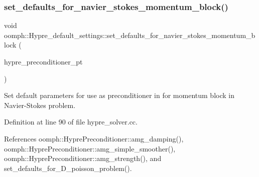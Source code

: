 \subsubsection{\texorpdfstring{set\+\_\+defaults\+\_\+for\+\_\+navier\+\_\+stokes\+\_\+momentum\+\_\+block()}{set\_defaults\_for\_navier\_stokes\_momentum\_block()}}
{\footnotesize\ttfamily void oomph\+::\+Hypre\+\_\+default\+\_\+settings\+::set\+\_\+defaults\+\_\+for\+\_\+navier\+\_\+stokes\+\_\+momentum\+\_\+block (\begin{DoxyParamCaption}\item[{\hyperlink{classoomph_1_1HyprePreconditioner}{Hypre\+Preconditioner} $\ast$}]{hypre\+\_\+preconditioner\+\_\+pt }\end{DoxyParamCaption})}



Set default parameters for use as preconditioner in for momentum block in Navier-\/\+Stokes problem. 



Definition at line 90 of file hypre\+\_\+solver.\+cc.



References oomph\+::\+Hypre\+Preconditioner\+::amg\+\_\+damping(), oomph\+::\+Hypre\+Preconditioner\+::amg\+\_\+simple\+\_\+smoother(), oomph\+::\+Hypre\+Preconditioner\+::amg\+\_\+strength(), and set\+\_\+defaults\+\_\+for\+\_\+D\+\_\+poisson\+\_\+problem().

